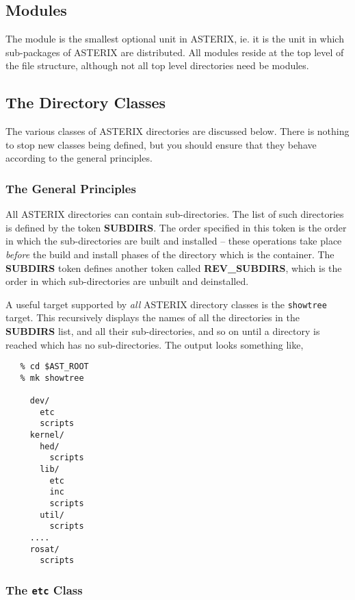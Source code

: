 \subsection{Modules}

The module is the smallest optional unit in ASTERIX, ie. it is the unit
in which sub-packages of ASTERIX are distributed. All modules reside at
the top level of the file structure, although not all top level directories
need be modules.

\subsection{The Directory Classes}

The various classes of ASTERIX directories are discussed below. There
is nothing to stop new classes being defined, but you should ensure
that they behave according to the general principles.

\subsubsection{The General Principles}

All ASTERIX directories can contain sub-directories. The list of such 
directories is defined by the token {\bf SUBDIRS}. The order specified
in this token is the order in which the sub-directories are built and
installed -- these operations take place {\em before} the build and
install phases of the directory which is the container. The {\bf SUBDIRS}
token defines another token called {\bf REV\_SUBDIRS}, which is the
order in which sub-directories are unbuilt and deinstalled.

A useful target supported by {\em all} ASTERIX directory classes is the
\verb+showtree+ target. This recursively displays the names of all the
directories in the {\bf SUBDIRS} list, and all their sub-directories,
and so on until a directory is reached which has no sub-directories. The
output looks something like,

\begin{verbatim}
   % cd $AST_ROOT
   % mk showtree

     dev/
       etc
       scripts
     kernel/
       hed/
         scripts
       lib/
         etc
         inc
         scripts
       util/
         scripts
     ....
     rosat/
       scripts
\end{verbatim}

\subsubsection{The {\tt etc} Class}

